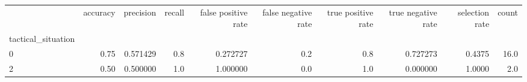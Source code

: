 \begin{tabular}{lrrrrrrrrr}
\toprule
{} &  accuracy &  precision &  recall &  false positive rate &  false negative rate &  true positive rate &  true negative rate &  selection rate &  count \\
tactical\_situation &           &            &         &                      &                      &                     &                     &                 &        \\
\midrule
0                  &      0.75 &   0.571429 &     0.8 &             0.272727 &                  0.2 &                 0.8 &            0.727273 &          0.4375 &   16.0 \\
2                  &      0.50 &   0.500000 &     1.0 &             1.000000 &                  0.0 &                 1.0 &            0.000000 &          1.0000 &    2.0 \\
\bottomrule
\end{tabular}
